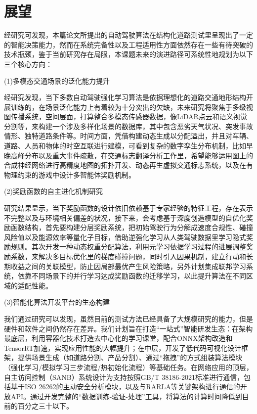\section{展望}

经研究可发现，本篇论文所提出的自动驾驶算法在结构化道路测试里呈现出了一定的智能决策能力，然而在系统完备性以及工程适用性方面依然存在一些有待突破的技术瓶颈，鉴于当前研究存在局限，本课题未来的演进路径可系统性地规划为以下三个核心方向：

(1)多模态交通场景的泛化能力提升

经研究发现，当下多数自动驾驶强化学习算法是依据理想化的道路交通地形结构开展训练的，在场景泛化能力上有着较为十分突出的欠缺，未来研究将聚焦于多级视图传播系统，空间层面，打算整合多模态传感器数据，像LiDAR点云和语义视觉分割等，来构建一个涉及多样化场景的数据库，其中包含恶劣天气状况、突发事故情形、独特道路条件等。时间方面，凭借构建动态生成以分配溢出，并且对车辆、道路、人员和物体的时空互联进行建模，可看到复杂的数字孪生分布机制，比如早晚高峰分布以及重大事件疏散，在交通标志翻译分析工作里，希望能够运用图上的合成神经网络进行高精度地图的拓扑开发、动态再生虚拟交通标志系统，以及在有物理约束的游戏中设计多智能体奖励机制。

(2)奖励函数的自主进化机制研究

研究结果显示，当下奖励函数的设计依旧依赖基于专家经验的特征工程，存在表示不完整以及与环境相关偏差的状况，接下来，会考虑基于深度创造模型的自优化奖励函数结构，首先要构建分层奖励系统，把初始驾驶行为分解成速度合规性、碰撞风险值以及能源效率等量化子目标，借助逆强化学习从人类驾驶数据里学习隐式奖励规则。其次开发一种动态权重分配算法，利用元学习依据学习过程的进展调整奖励系数，来解决多目标优化里的梯度碰撞问题，同时引入因果机制，建立行动和长期收益之间的关联模型，防止因局部最优产生风险策略，另外计划集成联邦学习系统，依靠不同场景下的并行学习达成奖励函数的迁移学习，以此提升算法在不同区域的适配性能。

(3)智能化算法开发平台的生态构建

我们通过研究可以发现，虽然目前的测试方法已经具备了大规模研究的能力，但是硬件和软件之间仍然存在差异。我们计划旨在打造“一站式”智能研发生态：在架构最底层，利用容器化技术打造去中心化的学习课堂，配合ONNX架构改造和TensorRT加速，实现应用性能的大幅提升；在中层，开发了低代码可视化设计框架，提供场景生成（如道路分割、产品分割）、通过“拖拽”的方式组装算法模块（强化学习/模拟学习三步流程/热初始化流程）等基础任务。在网络应用的顶层，自主访问控制（SANB）系统设计为支持按照GB/T 38186-2021标准进行通信，包括基于ISO 26262的主动安全分析模块，以及与RARLA等关键架构进行通信的开放API。通过开发完整的“数据训练-验证-处理”工具，将算法的计算时间降低到目前的百分之三十以下。

